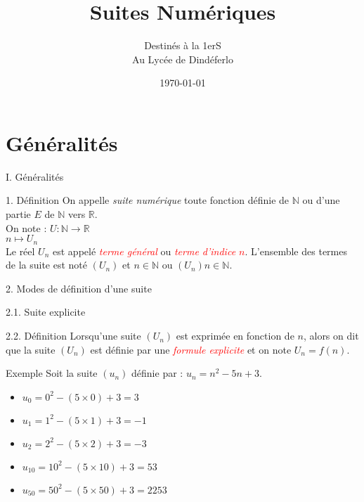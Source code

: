 \documentclass{beamer}
\title{\textbf{Suites Numériques}}
\author{Destinés à la 1erS\\Au Lycée de Dindéferlo}
\date{\today}
\begin{document}
\frame{\titlepage}

\section{Généralités}
\begin{frame}{I. Généralités}
    \begin{block}{1. Définition}
        On appelle \textit{suite numérique} toute fonction définie de $\mathbb{N}$ ou d'une partie $E$ de $\mathbb{N}$ vers $\mathbb{R}$. \\
        On note : $U : \mathbb{N} \rightarrow \mathbb{R}$ \\
        \hspace*{3.3cm}$n \mapsto U_{n}$ \\
        Le réel $U_n$ est appelé \textcolor{red}{\textit{terme général}} ou \textcolor{red}{\textit{terme d'indice $n$}}.
        L'ensemble des termes de la suite est noté $(U_n)$ et $n \in \mathbb{N}$ ou $(U_{n})n\in\mathbb{N}$.
    \end{block}
\end{frame}

\begin{frame}{2. Modes de définition d'une suite}
    \begin{block}{2.1. Suite explicite}
    \end{block}
    \begin{block}{2.2. Définition}
        Lorsqu'une suite $(U_{n})$ est exprimée en fonction de $n$, alors on dit que la suite $(U_{n})$ est définie par une \textcolor{red}{\textit{formule explicite}} et on note $U_{n} = f(n)$.
    \end{block}
    \begin{exampleblock}{Exemple}
        Soit la suite $\left(u_{n}\right)$ définie par : $u_{n}=n^{2}-5n+3.$
        \begin{itemize}
            \item $u_{0}=0^{2}-(5\times 0)+3=3$
            \item $u_{1}=1^{2}-(5\times 1)+3=-1$
            \item $u_{2}=2^{2}-(5\times 2)+3=-3$
            \item $u_{10}=10^{2}-(5\times 10)+3=53$
            \item $u_{50}=50^{2}-(5\times 50)+3=2253$
        \end{itemize}
    \end{exampleblock}
\end{frame}
\end{document}

